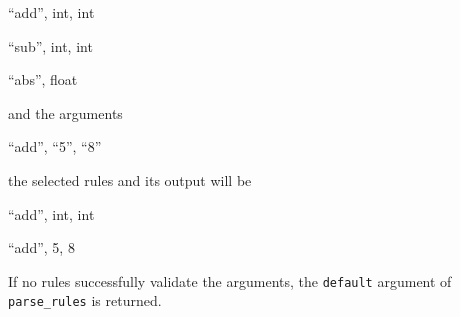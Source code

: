 \documentclass{article}
\begin{document}
			\begin{center}
				\item ``add'', int, int
				\item ``sub'', int, int
				\item ``abs'', float
			\end{center}

			and the arguments

			\begin{center}
				\item ``add'', ``5'', ``8''
			\end{center}

			the selected rules and its output will be

			\begin{center}
				\item ``add'', int, int
				\item ``add'', 5, 8
			\end{center}

			If no rules successfully validate the arguments, the \verb|default| argument of
			\verb|parse_rules| is returned.
\end{document}
